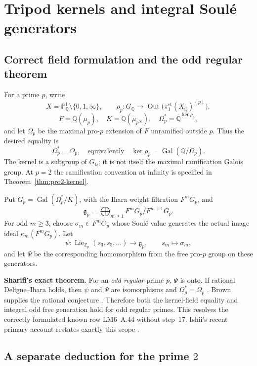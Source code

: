 \documentclass[11pt,a4paper]{article}
\theoremstyle{definition}
\begin{document}
\section{Tripod kernels and integral Soul\'e generators}
\label{sec:tripod-integral}

\subsection{Correct field formulation and the odd regular theorem}

For a prime $p$, write
\[
 X=\mathbb P^1_{\mathbb Q}\setminus\{0,1,\infty\},\qquad
 \rho_p:G_{\mathbb Q}\longrightarrow
 \operatorname{Out}\bigl(\pi_1^{\mathrm{et}}(X_{\overline{\mathbb Q}})^{(p)}\bigr),
\]
\[
 F=\mathbb Q(\mu_p),\quad K=\mathbb Q(\mu_{p^\infty}),\quad
 \Omega_p^*=\overline{\mathbb Q}^{\ker\rho_p},
\]
and let $\Omega_p$ be the maximal pro-$p$ extension of $F$ unramified outside $p$. Thus the desired equality is
\[
 \Omega_p^*=\Omega_p,
 \quad\text{equivalently}\quad
 \ker\rho_p=\operatorname{Gal}(\overline{\mathbb Q}/\Omega_p).
\]
The kernel is a subgroup of $G_{\mathbb Q}$; it is not itself the maximal ramification Galois group. At $p=2$ the ramification convention at infinity is specified in Theorem~\ref{thm:pro2-kernel}.

Put $G_p=\operatorname{Gal}(\Omega_p^*/K)$, with the Ihara weight filtration $F^mG_p$, and
\[
 \mathfrak g_p=\bigoplus_{m\geq1}F^mG_p/F^{m+1}G_p.
\]
For odd $m\geq3$, choose $\sigma_m\in F^mG_p$ whose Soul\'e value generates the actual image ideal $\kappa_m(F^mG_p)$. Let
\[
 \psi:\operatorname{Lie}_{\mathbb Z_p}(s_3,s_5,\ldots)
       \longrightarrow\mathfrak g_p,
 \qquad s_m\longmapsto\sigma_m,
\]
and let $\Psi$ be the corresponding homomorphism from the free pro-$p$ group on these generators.

\textbf{Sharifi's exact theorem.} For an \emph{odd regular} prime $p$, $\Psi$ is onto. If rational Deligne--Ihara holds, then $\psi$ and $\Psi$ are isomorphisms and $\Omega_p^*=\Omega_p$ \cite[Theorem~1.1, author's preprint p.~2]{Sharifi2002}. Brown supplies the rational conjecture \cite{Brown2012,Brown2019}. Therefore both the kernel-field equality and integral odd free generation hold for odd regular primes. This resolves the correctly formulated known row LM6~A.44 without step~17. Ishii's recent primary account restates exactly this scope \cite[Theorem~1.1 and Remark~1.1.1, p.~2]{IshiiKernel2026}.

\subsection{A separate deduction for the prime \texorpdfstring{$2$}{2}}
\label{sec:pro2-proof}
\end{document}
